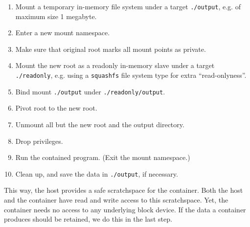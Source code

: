 \begin{enumerate}

\item Mount a temporary in-memory file system under a target \texttt{./output},
e.g. of maximum size 1 megabyte.

\item Enter a new mount namespace.

\item Make sure that original root marks all mount points as private.

\item Mount the new root as a readonly in-memory slave under a target
\texttt{./readonly}, e.g. using a \texttt{squashfs} file system type for extra
``read-onlyness''.

\item Bind mount \texttt{./output} under \texttt{./readonly/output}.

\item Pivot root to the new root.

\item Unmount all but the new root and the output directory.

\item Drop privileges.

\item Run the contained program. (Exit the mount namespace.)

\item Clean up, and save the data in \texttt{./output}, if necessary.

\end{enumerate}

This way, the host provides a safe scratchspace for the container. Both the
host and the container have read and write access to this scratchspace.  Yet,
the container needs no access to any underlying block device. If the data a
container produces should be retained, we do this in the last step.


